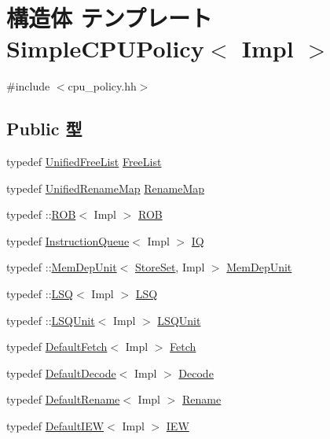 \hypertarget{structSimpleCPUPolicy}{
\section{構造体 テンプレート SimpleCPUPolicy$<$ Impl $>$}
\label{structSimpleCPUPolicy}
}


{\ttfamily \#include $<$cpu\_\-policy.hh$>$}\subsection*{Public 型}
\begin{DoxyCompactItemize}
\item 
typedef \hyperlink{classUnifiedFreeList}{UnifiedFreeList} \hyperlink{structSimpleCPUPolicy_a74a15704374ad611e569d99c3f99f3a4}{FreeList}
\item 
typedef \hyperlink{classUnifiedRenameMap}{UnifiedRenameMap} \hyperlink{structSimpleCPUPolicy_a562b8208c64b62e61ceee341d2931e5c}{RenameMap}
\item 
typedef ::\hyperlink{classROB}{ROB}$<$ Impl $>$ \hyperlink{structSimpleCPUPolicy_a0b7880d092bb7add137501986fbc6ced}{ROB}
\item 
typedef \hyperlink{classInstructionQueue}{InstructionQueue}$<$ Impl $>$ \hyperlink{structSimpleCPUPolicy_a88e5491f89e7e164d826eefd71d76267}{IQ}
\item 
typedef ::\hyperlink{classMemDepUnit}{MemDepUnit}$<$ \hyperlink{classStoreSet}{StoreSet}, Impl $>$ \hyperlink{structSimpleCPUPolicy_ad63764143a9c493ff3b22e54f84c469e}{MemDepUnit}
\item 
typedef ::\hyperlink{classLSQ}{LSQ}$<$ Impl $>$ \hyperlink{structSimpleCPUPolicy_ac6e42f5c44d9943d2f822e3628791925}{LSQ}
\item 
typedef ::\hyperlink{classLSQUnit}{LSQUnit}$<$ Impl $>$ \hyperlink{structSimpleCPUPolicy_a689bc5ac0ae514f3534fd9fb266efeb3}{LSQUnit}
\item 
typedef \hyperlink{classDefaultFetch}{DefaultFetch}$<$ Impl $>$ \hyperlink{structSimpleCPUPolicy_aa3e1cec2212c5a44abfb8c9751a04b5b}{Fetch}
\item 
typedef \hyperlink{classDefaultDecode}{DefaultDecode}$<$ Impl $>$ \hyperlink{structSimpleCPUPolicy_aca5dda7cc17827acd2748d7228838ede}{Decode}
\item 
typedef \hyperlink{classDefaultRename}{DefaultRename}$<$ Impl $>$ \hyperlink{structSimpleCPUPolicy_a7f06d90367c68f062331dc9fc709a4e9}{Rename}
\item 
typedef \hyperlink{classDefaultIEW}{DefaultIEW}$<$ Impl $>$ \hyperlink{structSimpleCPUPolicy_a22056ac0bac160e601df2d04260100be}{IEW}

\end{DoxyCompactItemize}
